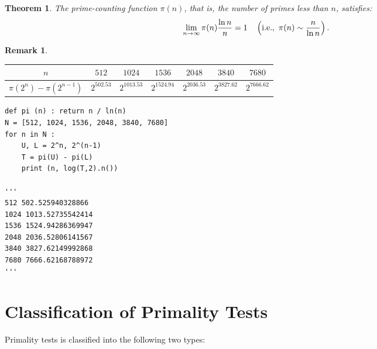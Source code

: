 \documentclass[12pt,openany]{book}
\newtheorem{theorem}{Theorem}[chapter]
\theoremstyle{definition}
\newtheorem{remark}{Remark}[chapter]
\newcommand{\ie}{\textnormal{i.e.}}
\newcommand{\of}[1]{\left( #1 \right)}
\begin{document}
	\begin{tcolorbox}[colback=white,colframe=thmcolor,arc=5pt,title={\color{white}\bf Prime Number Theorem}]
		\begin{theorem}
			The prime-counting function $\pi(n)$, that is, the number of primes less than $n$, satisfies: \[
			\lim\limits_{n\to\infty}\pi(n)\frac{\ln n}{n}=1\quad\of{\ie,\ \pi(n)\sim\frac{n}{\ln n}}.
			\]
		\end{theorem}
	\end{tcolorbox}
	\vspace{4pt}
	\begin{remark}
		\ \begin{table}[h]
			\centering
			\begin{tabular*}{\textwidth}{@{\extracolsep{\fill}}ccccccc}
				\toprule[1.2pt]
				$n$ & $512$ & $1024$ & $1536$ & $2048$ & $3840$ & $7680$ \\
				\midrule
				$\pi(2^n)-\pi(2^{n-1})$ & $2^{502.53}$ & $2^{1013.53}$ & $2^{1524.94}$ & $2^{2036.53}$ & $2^{3827.62}$ & $2^{7666.62}$ \\
				\bottomrule[1.2pt]
			\end{tabular*}
		\end{table}
	\end{remark}
	\vspace{4pt}
	\begin{lstlisting}[style=sage, caption={Prime-Counting Function (Sage)},captionpos=t]
def pi (n) : return n / ln(n)
N = [512, 1024, 1536, 2048, 3840, 7680]
for n in N :
	U, L = 2^n, 2^(n-1)
	T = pi(U) - pi(L)
	print (n, log(T,2).n())

'''
512 502.525940328866
1024 1013.52735542414
1536 1524.94286369947
2048 2036.52806141567
3840 3827.62149992868
7680 7666.62168788972
'''
	\end{lstlisting}
	
	\newpage
	\section{Classification of Primality Tests}
	Primality tests is classified into the following two types:
	
\end{document}
